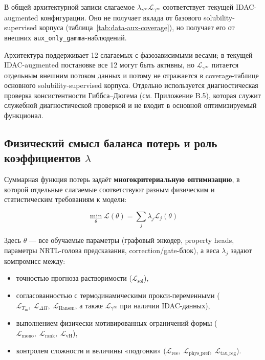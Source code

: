 \documentclass[11pt]{article}
\begin{document}
В общей архитектурной записи слагаемое $\lambda_{\gamma^\infty}\mathcal{L}_{\gamma^\infty}$ соответствует текущей IDAC-augmented конфигурации. Оно не получает вклада от базового solubility-supervised корпуса (таблица~\ref{tab:data-aux-coverage}), но получает его от внешних \texttt{aux\_only\_gamma}-наблюдений.

Архитектура поддерживает 12 слагаемых с фазозависимыми весами; в текущей IDAC-augmented постановке все 12 могут быть активны, но $\mathcal{L}_{\gamma^\infty}$ питается отдельным внешним потоком данных и потому не отражается в coverage-таблице основного solubility-supervised корпуса. Отдельно используется диагностическая проверка консистентности Гиббса--Дюгема (см. Приложение B.5), которая служит служебной диагностической проверкой и не входит в основной оптимизируемый функционал.

\subsection{Физический смысл баланса потерь и роль коэффициентов $\lambda$}

Суммарная функция потерь задаёт \textbf{многокритериальную оптимизацию}, в которой отдельные слагаемые соответствуют разным физическим и статистическим требованиям к модели:

\begin{equation*}
\min_{\theta} \mathcal{L}(\theta) = \sum_j \lambda_j \mathcal{L}_j(\theta)
\end{equation*}

Здесь $\theta$ --- все обучаемые параметры (графовый энкодер, property heads, параметры NRTL-голова предсказания, correction/gate-блок), а веса $\lambda_j$ задают компромисс между:

\begin{itemize}
    \item точностью прогноза растворимости ($\mathcal{L}_{\mathrm{sol}}$),
    \item согласованностью с термодинамическими прокси-переменными ($\mathcal{L}_{T_{\mathrm{m}}},\; \mathcal{L}_{\Delta H},\; \mathcal{L}_{\mathrm{Hansen}}$, а также $\mathcal{L}_{\gamma^\infty}$ при наличии IDAC-данных),
    \item выполнением физически мотивированных ограничений формы ($\mathcal{L}_{\mathrm{mono}},\; \mathcal{L}_{\mathrm{rank}},\; \mathcal{L}_{\mathrm{vH}}$),
    \item контролем сложности и величины «подгонки» ($\mathcal{L}_{\mathrm{res}},\; \mathcal{L}_{\mathrm{phys\_pref}},\; \mathcal{L}_{\mathrm{tau\_reg}}$).
\end{itemize}
\end{document}
